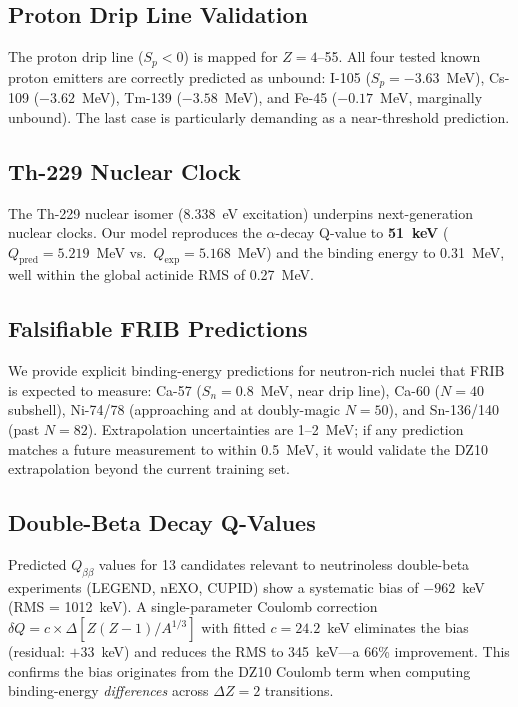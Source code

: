 \documentclass[letterpaper,11pt]{article}
\begin{document}
\subsection{Proton Drip Line Validation}

The proton drip line ($S_p < 0$) is mapped for $Z = 4$--55. All four tested
known proton emitters are correctly predicted as unbound: I-105 ($S_p =
-3.63$~MeV), Cs-109 ($-3.62$~MeV), Tm-139 ($-3.58$~MeV), and Fe-45
($-0.17$~MeV, marginally unbound). The last case is particularly demanding
as a near-threshold prediction.

\subsection{Th-229 Nuclear Clock}

The Th-229 nuclear isomer (8.338~eV excitation) underpins next-generation
nuclear clocks. Our model reproduces the $\alpha$-decay Q-value to
\textbf{51~keV} ($Q_\text{pred} = 5.219$~MeV vs.\ $Q_\text{exp} =
5.168$~MeV) and the binding energy to 0.31~MeV, well within the global
actinide RMS of 0.27~MeV.

\subsection{Falsifiable FRIB Predictions}

We provide explicit binding-energy predictions for neutron-rich nuclei
that FRIB is expected to measure: Ca-57 ($S_n = 0.8$~MeV, near drip
line), Ca-60 ($N = 40$ subshell), Ni-74/78 (approaching and at doubly-magic
$N = 50$), and Sn-136/140 (past $N = 82$). Extrapolation uncertainties
are 1--2~MeV; if any prediction matches a future measurement to within
0.5~MeV, it would validate the DZ10 extrapolation beyond the current
training set.

\subsection{Double-Beta Decay Q-Values}

Predicted $Q_{\beta\beta}$ values for 13 candidates relevant to
neutrinoless double-beta experiments (LEGEND, nEXO, CUPID) show a
systematic bias of $-962$~keV (RMS = 1012~keV). A single-parameter
Coulomb correction $\delta Q = c \times \Delta[Z(Z{-}1)/A^{1/3}]$ with
fitted $c = 24.2$~keV eliminates the bias (residual: $+33$~keV) and
reduces the RMS to 345~keV---a 66\% improvement. This confirms the bias
originates from the DZ10 Coulomb term when computing binding-energy
\emph{differences} across $\Delta Z = 2$ transitions.
\end{document}
